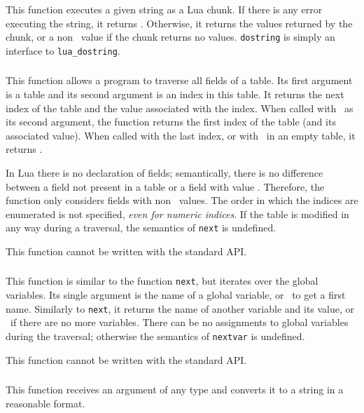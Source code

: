 \subsubsection*{}
This function executes a given string as a Lua chunk.
If there is any error executing the string, it returns \nil.
Otherwise, it returns the values returned by the chunk,
or a non \nil\ value if the chunk returns no values.
\verb|dostring| is simply an interface to \verb|lua_dostring|.

\subsubsection*{}
This function allows a program to traverse all fields of a table.
Its first argument is a table and its second argument
is an index in this table.
It returns the next index of the table and the
value associated with the index.
When called with \nil\ as its second argument,
the function returns the first index
of the table (and its associated value).
When called with the last index, or with \nil\ in an empty table,
it returns \nil.

In Lua there is no declaration of fields;
semantically, there is no difference between a
field not present in a table or a field with value \nil.
Therefore, the function only considers fields with non \nil\ values.
The order in which the indices are enumerated is not specified,
{\em even for numeric indices}.
If the table is modified in any way during a traversal,
the semantics of \verb|next| is undefined.

This function cannot be written with the standard API.

\subsubsection*{}
This function is similar to the function \verb'next',
but iterates over the global variables.
Its single argument is the name of a global variable,
or \nil\ to get a first name.
Similarly to \verb'next', it returns the name of another variable
and its value,
or \nil\ if there are no more variables.
There can be no assignments to global variables during the traversal;
otherwise the semantics of \verb|nextvar| is undefined.

This function cannot be written with the standard API.

\subsubsection*{}
This function receives an argument of any type and
converts it to a string in a reasonable format.

